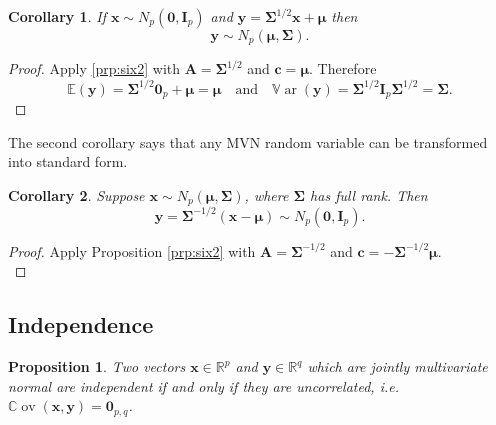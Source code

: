 \documentclass[]{book}
\newtheorem{corollary}{Corollary}[chapter]
\newtheorem{proposition}{Proposition}[chapter]
\theoremstyle{definition}
\theoremstyle{definition}
\theoremstyle{definition}
\theoremstyle{remark}
\begin{document}
\begin{corollary}
\protect\hypertarget{cor:csix2}{}{\label{cor:csix2} } If \(\mathbf x\sim N_p(\boldsymbol 0,\mathbf I_p)\) and \(\mathbf y= \boldsymbol{\Sigma}^{1/2} \mathbf x+ {\boldsymbol{\mu}}\) then \[\mathbf y\sim N_p({\boldsymbol{\mu}},\boldsymbol{\Sigma}).\]
\end{corollary}

\begin{proof}
{}Apply \ref{prp:six2} with \(\mathbf A= \boldsymbol{\Sigma}^{1/2}\) and \(\mathbf c= {\boldsymbol{\mu}}\). Therefore
\[{\mathbb{E}}(\mathbf y) = \boldsymbol{\Sigma}^{1/2} \boldsymbol 0_p + {\boldsymbol{\mu}}= {\boldsymbol{\mu}}\quad \mbox{and}\quad {\mathbb{V}\operatorname{ar}}(\mathbf y) = \boldsymbol{\Sigma}^{1/2} \mathbf I_p \boldsymbol{\Sigma}^{1/2} = \boldsymbol{\Sigma}.\]
\end{proof}

The second corollary says that any MVN random variable can be transformed into standard form.

\begin{corollary}
\protect\hypertarget{cor:csix3}{}{\label{cor:csix3} }Suppose \(\mathbf x\sim N_p({\boldsymbol{\mu}},\boldsymbol{\Sigma})\), where \(\boldsymbol{\Sigma}\) has full rank. Then\\
\[\mathbf y= \boldsymbol{\Sigma}^{-1/2}(\mathbf x- {\boldsymbol{\mu}}) \sim N_p(\boldsymbol 0,\mathbf I_p).\]
\end{corollary}

\begin{proof}
{}Apply Proposition \ref{prp:six2} with \(\mathbf A= \boldsymbol{\Sigma}^{-1/2}\) and \(\mathbf c= - \boldsymbol{\Sigma}^{-1/2} {\boldsymbol{\mu}}\).\\
\end{proof}

\hypertarget{independence}{%
\subsection{Independence}\label{independence}}

\begin{proposition}
\protect\hypertarget{prp:six4}{}{\label{prp:six4} }Two vectors \(\mathbf x\in\mathbb{R}^p\) and \(\mathbf y\in\mathbb{R}^q\) which are jointly multivariate normal are independent if and only if they are uncorrelated, i.e. \({\mathbb{C}\operatorname{ov}}(\mathbf x,\mathbf y) = \boldsymbol 0_{p,q}\).
\end{proposition}
\end{document}
